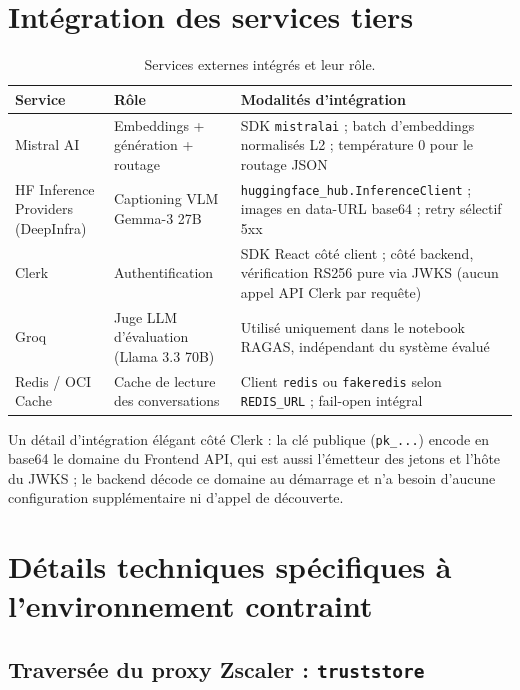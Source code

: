 \section{Intégration des services tiers}
\label{sec:integrations}

\begin{table}[!htb]
\centering\small
\caption{Services externes intégrés et leur rôle.}
\label{tab:services}
\begin{tabularx}{\textwidth}{@{}p{3.4cm}p{4.2cm}X@{}}
\toprule
\textbf{Service} & \textbf{Rôle} & \textbf{Modalités d'intégration} \\
\midrule
Mistral AI & Embeddings + génération + routage & SDK \texttt{mistralai} ; batch d'embeddings normalisés L2 ; température 0 pour le routage JSON \\
HF Inference Providers (DeepInfra) & Captioning VLM Gemma-3 27B & \texttt{huggingface\_hub.InferenceClient} ; images en data-URL base64 ; retry sélectif 5xx \\
Clerk & Authentification & SDK React côté client ; côté backend, vérification RS256 pure via JWKS (aucun appel API Clerk par requête) \\
Groq & Juge LLM d'évaluation (Llama 3.3 70B) & Utilisé uniquement dans le notebook RAGAS, indépendant du système évalué \\
Redis / OCI Cache & Cache de lecture des conversations & Client \texttt{redis} ou \texttt{fakeredis} selon \texttt{REDIS\_URL} ; fail-open intégral \\
\bottomrule
\end{tabularx}
\end{table}

Un détail d'intégration élégant côté Clerk : la clé publique (\texttt{pk\_...}) encode en
base64 le domaine du Frontend API, qui est aussi l'émetteur des jetons et l'hôte du JWKS ;
le backend décode ce domaine au démarrage et n'a besoin d'aucune configuration
supplémentaire ni d'appel de découverte.

\section{Détails techniques spécifiques à l'environnement contraint}
\label{sec:details-contraintes}

\subsection{Traversée du proxy Zscaler : \texttt{truststore}}

